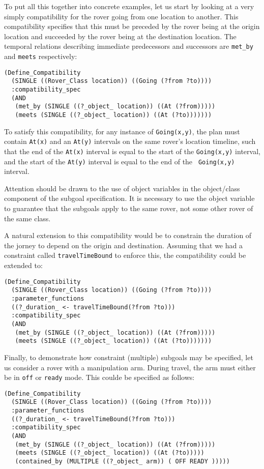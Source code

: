 To put all this together into concrete examples, let us start by 
looking at a very simply compatibility for the rover going from one 
location to another.  This compatibility specifies that this must be 
preceded by the rover being at the origin location and succeeded by 
the rover being at the destination location.  The temporal relations 
describing immediate predecessors and successors are {\tt met\_by} and 
{\tt meets} respectively:
\begin{verbatim}
(Define_Compatibility
  (SINGLE ((Rover_Class location)) ((Going (?from ?to))))
  :compatibility_spec
  (AND
   (met_by (SINGLE ((?_object_ location)) ((At (?from)))))
   (meets (SINGLE ((?_object_ location)) ((At (?to)))))))
\end{verbatim}
To satisfy this compatibility, for any instance of {\tt Going(x,y)},
the plan must contain {\tt At(x)} and an {\tt At(y)} intervals on the
same rover's location timeline, such that the end of the {\tt At(x)}
interval is equal to the start of the {\tt Going(x,y)} interval, and
the start of the {\tt At(y)} interval is equal to the end of the {\tt
Going(x,y)} interval.

Attention should be drawn to the use of object variables in the
object/class component of the subgoal specification.  It is necessary
to use the object variable to guarantee that the subgoals apply to the
same rover, not some other rover of the same class.

A natural extension to this compatibility would be to constrain the
duration of the jorney to depend on the origin and destination. 
Assuming that we had a constraint called {\tt travelTimeBound} to
enforce this, the compatibility could be extended to:
\begin{verbatim}
(Define_Compatibility
  (SINGLE ((Rover_Class location)) ((Going (?from ?to))))
  :parameter_functions
  ((?_duration_ <- travelTimeBound(?from ?to)))
  :compatibility_spec
  (AND
   (met_by (SINGLE ((?_object_ location)) ((At (?from)))))
   (meets (SINGLE ((?_object_ location)) ((At (?to)))))))
\end{verbatim}

Finally, to demonstrate how constraint (multiple) subgoals may be 
specified, let us consider a rover with a manipulation arm.  During 
travel, the arm must either be in {\tt off} or {\tt ready} mode.  This 
coulde be specified as follows:
\begin{verbatim}
(Define_Compatibility
  (SINGLE ((Rover_Class location)) ((Going (?from ?to))))
  :parameter_functions
  ((?_duration_ <- travelTimeBound(?from ?to)))
  :compatibility_spec
  (AND
   (met_by (SINGLE ((?_object_ location)) ((At (?from)))))
   (meets (SINGLE ((?_object_ location)) ((At (?to)))))
   (contained_by (MULTIPLE ((?_object_ arm)) ( OFF READY )))))
\end{verbatim}



